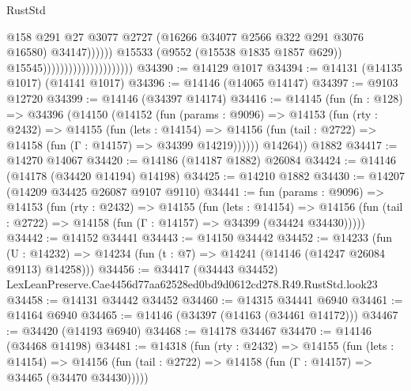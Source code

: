 \begin{lexlean}{RustStd}
\begin{coremodule}
                                                          @158
                                                          @291
                                                          @27
                                                          @3077
                                                          @2727
                                                          (@16266
                                                            @34077
                                                            @2566
                                                            @322
                                                            @291
                                                            @3076
                                                            @16580)
                                                          @34147))))))
                                              @15533
                                              (@9552 (@15538 @1835 @1857 @629))
                                              @15545)))))))))))))))))))))
@34390 := @14129 @1017
@34394 := @14131 (@14135 @1017) (@14141 @1017)
@34396 := @14146 (@14065 @14147)
@34397 := @9103 @12720
@34399 := @14146 (@34397 @14174)
@34416 := @14145
    (fun (fn : @128) =>
    @34396
      (@14150
        (@14152
          (fun (params : @9096) =>
          @14153
            (fun (rty : @2432) =>
            @14155
              (fun (lets : @14154) =>
              @14156 (fun (tail : @2722) => @14158 (fun (Γ : @14157) => @34399 @14219))))))
        @14264))
    @1882
@34417 := @14270 @14067
@34420 := @14186 (@14187 @1882) @26084
@34424 := @14146 (@14178 (@34420 @14194) @14198)
@34425 := @14210 @1882
@34430 := @14207 (@14209 @34425 @26087 @9107 @9110)
@34441 := fun (params : @9096) =>
  @14153
    (fun (rty : @2432) =>
    @14155
      (fun (lets : @14154) =>
      @14156 (fun (tail : @2722) => @14158 (fun (Γ : @14157) => @34399 (@34424 @34430)))))
@34442 := @14152 @34441
@34443 := @14150 @34442
@34452 := @14233
    (fun (U : @14232) => @14234 (fun (t : @7) => @14241 (@14146 (@14247 @26084 @9113) @14258)))
@34456 := @34417
    (@34443 @34452)
    LexLeanPreserve.Cae4456d77aa62528ed0bd9d0612cd278.R49.RustStd.look23
@34458 := @14131 @34442 @34452
@34460 := @14315 @34441 @6940
@34461 := @14164 @6940
@34465 := @14146 (@34397 (@14163 (@34461 @14172)))
@34467 := @34420 (@14193 @6940)
@34468 := @14178 @34467
@34470 := @14146 (@34468 @14198)
@34481 := @14318
    (fun (rty : @2432) =>
    @14155
      (fun (lets : @14154) =>
      @14156 (fun (tail : @2722) => @14158 (fun (Γ : @14157) => @34465 (@34470 @34430)))))

\end{coremodule}
\end{lexlean}
